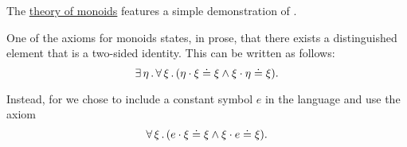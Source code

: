 \begin{example}\label{ex:existential_quantifier_removal_monoids}
  The \hyperref[def:monoid/theory]{theory of monoids} features a simple demonstration of .

  One of the axioms for monoids states, in prose, that there exists a distinguished element that is a two-sided identity. This can be written as follows:
  \begin{equation*}
    \exists \thinspace \eta \thinspace . \thinspace \forall \thinspace \xi \thinspace . \thinspace (\eta \cdot \xi \doteq \xi \wedge \xi \cdot \eta \doteq \xi).
  \end{equation*}

  Instead, for  we chose to include a constant symbol \( e \) in the language and use the axiom
  \begin{equation*}
    \forall \thinspace \xi \thinspace . \thinspace (e \cdot \xi \doteq \xi \wedge \xi \cdot e \doteq \xi).
  \end{equation*}
\end{example}

